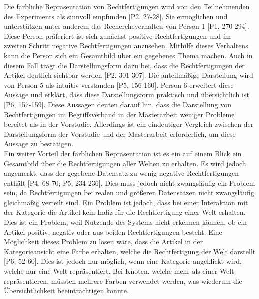Die farbliche Repräsentation von Rechtfertigungen wird von den Teilnehmenden des Experiments als sinnvoll empfunden [P2, 27-28].
Sie ermöglichen und unterstützen unter anderem das Rechercheverhalten von Person 1 [P1, 270-294]. %
Diese Person präferiert ist sich zunächst positive Rechtfertigungen und im zweiten Schritt negative Rechtfertigungen anzusehen.
Mithilfe dieses Verhaltens kann die Person sich ein Gesamtbild über ein gegebenes Thema machen.
Auch in diesem Fall trägt die Darstellungsform dazu bei, dass die Rechtfertigungen der Artikel deutlich sichtbar werden [P2, 301-307].
Die anteilmäßige Darstellung wird von Person 5 als intuitiv verstanden [P5, 156-160].
Person 6 erweitert diese Aussage und erklärt, dass diese Darstellungsform praktisch und übersichtlich ist [P6, 157-159].
Diese Aussagen deuten darauf hin, dass die Darstellung von Rechtfertigungen im Begriffsverband in der Masterarbeit weniger Probleme bereitet als in der Vorstudie.
Allerdings ist ein eindeutiger Vergleich zwischen der Darstellungsform der Vorstudie und der Masterarbeit erforderlich, um diese Aussage zu bestätigen. \\

Ein weiter Vorteil der farblichen Repräsentation ist es ein auf einem Blick ein Gesamtbild über die Rechtfertigungen aller Welten zu erhalten.
Es wird jedoch angemerkt, dass der gegebene Datensatz zu wenig negative Rechtfertigungen enthält [P4, 68-70; P5, 234-236].
Dies muss jedoch nicht zwangsläufig ein Problem sein, da Rechtfertigungen bei realen und größeren Datensätzen nicht zwangsläufig gleichmäßig verteilt sind.
Ein Problem ist jedoch, dass bei einer Interaktion mit der Kategorie die Artikel kein Indiz für die Rechtfertigung einer Welt erhalten.
Dies ist ein Problem, weil Nutzende des Systems nicht erkennen können, ob ein Artikel positiv, negativ oder aus beiden Rechtfertigungen besteht.
Eine Möglichkeit dieses Problem zu lösen wäre, dass die Artikel in der Kategorieansicht eine Farbe erhalten, welche die Rechtfertigung der Welt darstellt [P6, 52-60].
Dies ist jedoch nur möglich, wenn eine Kategorie angeklickt wird, welche nur eine Welt repräsentiert.
Bei Knoten, welche mehr als einer Welt repräsentieren, müssten mehrere Farben verwendet werden, was wiederum die Übersichtlichkeit beeinträchtigen könnte.\\

